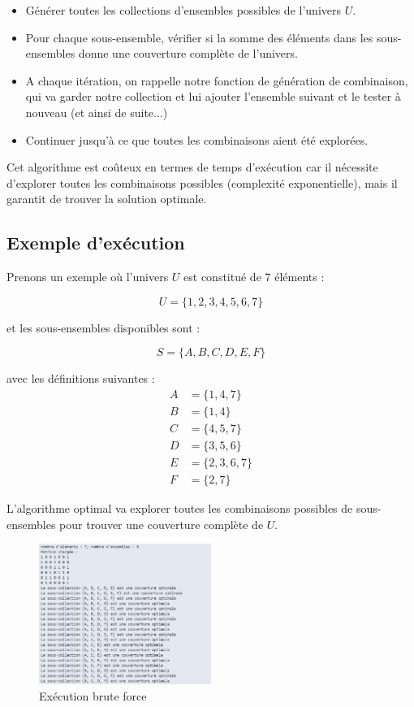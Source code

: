 \documentclass[a4paper, 12pt, twoside]{article}
\begin{document}
\begin{itemize}
    \item Générer toutes les collections d'ensembles possibles de l'univers \( U \).
    \item Pour chaque sous-ensemble, vérifier si la somme des éléments dans les sous-ensembles 
	donne une couverture complète de l'univers.
	\item A chaque itération, on rappelle notre fonction de génération de combinaison, qui va garder notre collection et lui ajouter
	l'ensemble suivant et le tester à nouveau (et ainsi de suite...)
    \item Continuer jusqu'à ce que toutes les combinaisons aient été explorées.
\end{itemize}

Cet algorithme est coûteux en termes de temps d'exécution car il nécessite d'explorer toutes les combinaisons possibles (complexité exponentielle), mais il garantit de trouver la solution optimale.

\subsection{Exemple d'exécution}


Prenons un exemple où l'univers \( U \) est constitué de 7 éléments :

\[
U = \{1, 2, 3, 4, 5, 6, 7\}
\]

et les sous-ensembles disponibles sont :

\[
S = \{A, B, C, D, E, F\}
\]

avec les définitions suivantes :\\
\begin{align*}
A &= \{1, 4, 7\} \\
B &= \{1, 4\} \\
C &= \{4, 5, 7\} \\
D &= \{3, 5, 6\} \\
E &= \{2, 3, 6, 7\} \\
F &= \{2, 7\}
\end{align*}

L'algorithme optimal va explorer toutes les combinaisons possibles de sous-ensembles pour trouver 
une couverture complète de \( U \).

\begin{figure}[h]  %
    \centering  %
    \includegraphics[width=0.5\textwidth]{./optimal.png}  %
    \caption{Exécution brute force}
    \label{fig:exemple_image}  %
\end{figure}
\end{document}
